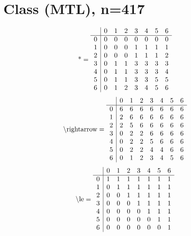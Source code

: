 \documentclass[11pt]{article}
\begin{document}
\section{Class (MTL), n=417}
\[\text{*} = 
\begin{array}{r | r r r r r r r}
 & 0 & 1 & 2 & 3 & 4 & 5 & 6 \\ \hline
0 & 0 & 0 & 0 & 0 & 0 & 0 & 0 \\
1 & 0 & 0 & 0 & 1 & 1 & 1 & 1 \\
2 & 0 & 0 & 0 & 1 & 1 & 1 & 2 \\
3 & 0 & 1 & 1 & 3 & 3 & 3 & 3 \\
4 & 0 & 1 & 1 & 3 & 3 & 3 & 4 \\
5 & 0 & 1 & 1 & 3 & 3 & 5 & 5 \\
6 & 0 & 1 & 2 & 3 & 4 & 5 & 6 \\
\end{array}
\]
\[\text{\textbackslash rightarrow} = 
\begin{array}{r | r r r r r r r}
 & 0 & 1 & 2 & 3 & 4 & 5 & 6 \\ \hline
0 & 6 & 6 & 6 & 6 & 6 & 6 & 6 \\
1 & 2 & 6 & 6 & 6 & 6 & 6 & 6 \\
2 & 2 & 5 & 6 & 6 & 6 & 6 & 6 \\
3 & 0 & 2 & 2 & 6 & 6 & 6 & 6 \\
4 & 0 & 2 & 2 & 5 & 6 & 6 & 6 \\
5 & 0 & 2 & 2 & 4 & 4 & 6 & 6 \\
6 & 0 & 1 & 2 & 3 & 4 & 5 & 6 \\
\end{array}
\]
\[\text{\textbackslash le} = 
\begin{array}{r | r r r r r r r}
 & 0 & 1 & 2 & 3 & 4 & 5 & 6 \\ \hline
0 & 1 & 1 & 1 & 1 & 1 & 1 & 1 \\
1 & 0 & 1 & 1 & 1 & 1 & 1 & 1 \\
2 & 0 & 0 & 1 & 1 & 1 & 1 & 1 \\
3 & 0 & 0 & 0 & 1 & 1 & 1 & 1 \\
4 & 0 & 0 & 0 & 0 & 1 & 1 & 1 \\
5 & 0 & 0 & 0 & 0 & 0 & 1 & 1 \\
6 & 0 & 0 & 0 & 0 & 0 & 0 & 1 \\
\end{array}
\]
\end{document}
